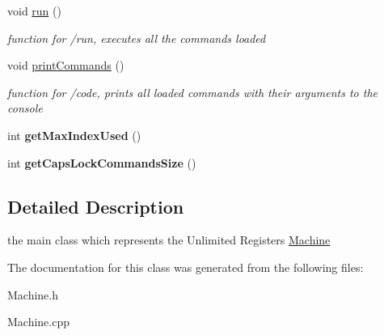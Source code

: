 \begin{DoxyCompactItemize}
\mbox{\label{class_machine_a0cff28a3e26aa300f706db443710760b}} 
void \mbox{\hyperlink{class_machine_a0cff28a3e26aa300f706db443710760b}{run}} ()
\begin{DoxyCompactList}\small\item\em function for /run, executes all the commands loaded \end{DoxyCompactList}\item 
\mbox{\label{class_machine_ab7a85e0b128fce64575b8fb397d9cf79}} 
void \mbox{\hyperlink{class_machine_ab7a85e0b128fce64575b8fb397d9cf79}{print\+Commands}} ()
\begin{DoxyCompactList}\small\item\em function for /code, prints all loaded commands with their arguments to the console \end{DoxyCompactList}\item 
\mbox{\label{class_machine_a7cbfc00527df979e6774bf4a6615e6ee}} 
int {\bfseries get\+Max\+Index\+Used} ()
\item 
\mbox{\label{class_machine_a8549cef571ed3ece68d73e1e831e657c}} 
int {\bfseries get\+Caps\+Lock\+Commands\+Size} ()
\end{DoxyCompactItemize}


\subsection{Detailed Description}
the main class which represents the Unlimited Registers \mbox{\hyperlink{class_machine}{Machine}} 

The documentation for this class was generated from the following files\+:\begin{DoxyCompactItemize}
\item 
Machine.\+h\item 
Machine.\+cpp\end{DoxyCompactItemize}
